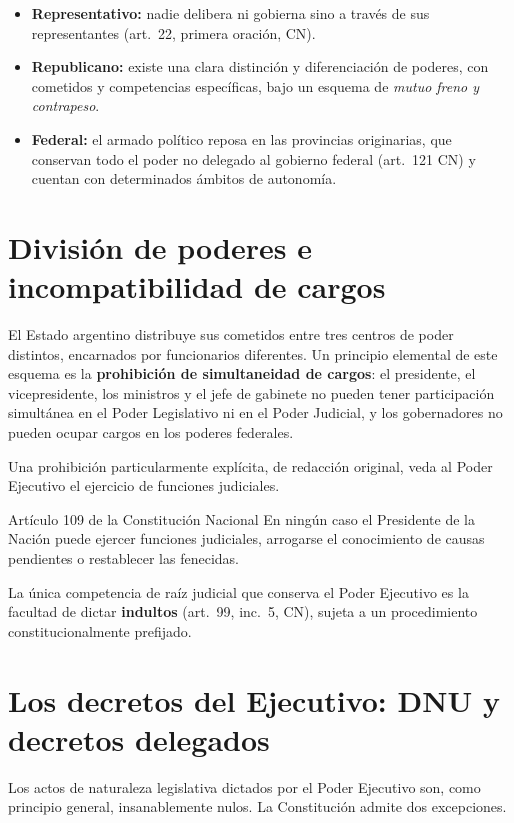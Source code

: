 \documentclass[12pt,oneside]{book}
\begin{document}
\begin{itemize}
    \item \textbf{Representativo:} nadie delibera ni gobierna sino a través de sus representantes (art.\ 22, primera oración, CN).
    \item \textbf{Republicano:} existe una clara distinción y diferenciación de poderes, con cometidos y competencias específicas, bajo un esquema de \emph{mutuo freno y contrapeso}.
    \item \textbf{Federal:} el armado político reposa en las provincias originarias, que conservan todo el poder no delegado al gobierno federal (art.\ 121 CN) y cuentan con determinados ámbitos de autonomía.
\end{itemize}

\section{División de poderes e incompatibilidad de cargos}

El Estado argentino distribuye sus cometidos entre tres centros de poder distintos, encarnados por funcionarios diferentes. Un principio elemental de este esquema es la \textbf{prohibición de simultaneidad de cargos}: el presidente, el vicepresidente, los ministros y el jefe de gabinete no pueden tener participación simultánea en el Poder Legislativo ni en el Poder Judicial, y los gobernadores no pueden ocupar cargos en los poderes federales.

Una prohibición particularmente explícita, de redacción original, veda al Poder Ejecutivo el ejercicio de funciones judiciales.

\begin{norma}{Artículo 109 de la Constitución Nacional}
En ningún caso el Presidente de la Nación puede ejercer funciones judiciales, arrogarse el conocimiento de causas pendientes o restablecer las fenecidas.
\end{norma}

La única competencia de raíz judicial que conserva el Poder Ejecutivo es la facultad de dictar \textbf{indultos} (art.\ 99, inc.\ 5, CN), sujeta a un procedimiento constitucionalmente prefijado.

\section{Los decretos del Ejecutivo: DNU y decretos delegados}

Los actos de naturaleza legislativa dictados por el Poder Ejecutivo son, como principio general, insanablemente nulos. La Constitución admite dos excepciones.
\end{document}

